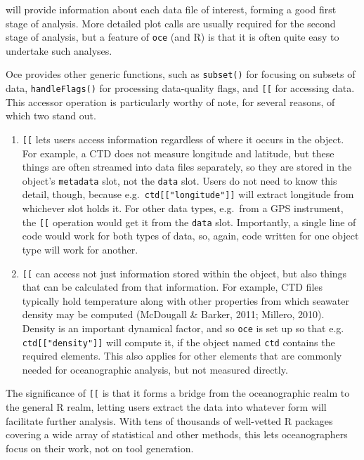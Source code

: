 \documentclass[10pt,a4paper,onecolumn]{article}
\begin{document}
will provide information about each data file of interest, forming a
good first stage of analysis. More detailed plot calls are usually
required for the second stage of analysis, but a feature of \texttt{oce}
(and R) is that it is often quite easy to undertake such analyses.

Oce provides other generic functions, such as \texttt{subset()} for
focusing on subsets of data, \texttt{handleFlags()} for processing
data-quality flags, and \texttt{{[}{[}} for accessing data. This
accessor operation is particularly worthy of note, for several reasons,
of which two stand out.

\begin{enumerate}
\def\labelenumi{\arabic{enumi}.}
\item
  \texttt{{[}{[}} lets users access information regardless of where it
  occurs in the object. For example, a CTD does not measure longitude
  and latitude, but these things are often streamed into data files
  separately, so they are stored in the object's \texttt{metadata} slot,
  not the \texttt{data} slot. Users do not need to know this detail,
  though, because e.g.~\texttt{ctd{[}{[}"longitude"{]}{]}} will extract
  longitude from whichever slot holds it. For other data types,
  e.g.~from a GPS instrument, the \texttt{{[}{[}} operation would get it
  from the \texttt{data} slot. Importantly, a single line of code would
  work for both types of data, so, again, code written for one object
  type will work for another.
\item
  \texttt{{[}{[}} can access not just information stored within the
  object, but also things that can be calculated from that information.
  For example, CTD files typically hold temperature along with other
  properties from which seawater density may be computed (McDougall \&
  Barker, 2011; Millero, 2010). Density is an important dynamical
  factor, and so \texttt{oce} is set up so that e.g.
  \texttt{ctd{[}{[}"density"{]}{]}} will compute it, if the object named
  \texttt{ctd} contains the required elements. This also applies for
  other elements that are commonly needed for oceanographic analysis,
  but not measured directly.
\end{enumerate}

The significance of \texttt{{[}{[}} is that it forms a bridge from the
oceanographic realm to the general R realm, letting users extract the
data into whatever form will facilitate further analysis. With tens of
thousands of well-vetted R packages covering a wide array of statistical
and other methods, this lets oceanographers focus on their work, not on
tool generation.
\end{document}
